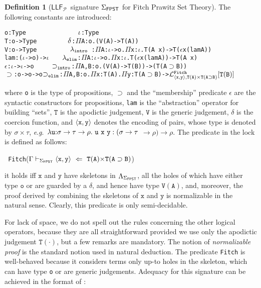 \documentclass[submission,copyright,creativecommons]{eptcs}
\theoremstyle{plain}
\theoremstyle{definition}
\newtheorem{definition}{Definition}[section]
\newcommand{\LLFP}  {\mbox{$\mathsf{LLF}_{\mathcal P}$}}
\newcommand {\eg}        {{\textit{e}.\textit{g}.}}
\newcommand {\Lock}   [4] {{\mathcal{L}}^{#1}_{#2, #3}[{#4}]} \newcommand {\LockC} [3] {{\mathcal{L}}^{#1}_{#2}      [{#3}]}
\newcommand{\fwd}[1]  {\hspace{#1mm}}
\newcommand{\down}[1] {\vspace{#1mm}}
\begin{document}
\begin{definition}[\LLFP\ signature $\Sigma_{\sf FPST}$ for Fitch
  Prawitz Set Theory]\label{signature-fitch}
The  following constants are introduced: {\begin{alltt}
o   : Type \(\fwd{26}\iota\)        : Type
T   : o -> Type \(\fwd{15.5}\delta\)        : \(\Pi\)A:o.  (V(A) -> T(A))
V   : o -> Type \(\fwd{16.5}\mathtt{\lambda_{intro}}\) \,\;: \(\Pi\)A:\(\iota\) ->o.\(\Pi\)x:\(\iota\).T(A\ x) -> T(\(\epsilon\) x (lam A))
lam : (\(\iota\) -> o)-> \(\iota\) \(\fwd{6.5}\mathtt{\lambda_{elim}}\)  : \(\Pi\)A:\(\iota\) ->o.\(\Pi\)x:\(\iota\).T(\(\epsilon\) x (lam A))->T(A\ x)
\(\epsilon\)   : \(\iota\) -> \({\iota}\) -> o \(\fwd{9}\mathtt{\supset_{intro}}\): \(\Pi\)A,B:o.(V(A) -> T(B)) -> (T(A \(\supset\)B))
\(\supset \)  \!: o -> o -> o \(\hfill\mathtt{\supset_{elim}}\) : \(\Pi\)A,B:o.\(\Pi\)x:T(A).\(\Pi\)y:T(A\(\supset\)B) -> \({\Lock{\scriptsize\tt{Fitch}}{\scriptsize{\mathtt{\langle{x},y\rangle}}}{\scriptsize\mathtt{{T(A)}\times\mathtt{T(A{\supset}B)}}}{\mathtt{T(B)}}}\)
\end{alltt}
}
\noindent where {\tt o} is the type of propositions, $\supset$ and the
``membership'' predicate $\epsilon$ are the syntactic constructors for
propositions, {\tt lam} is the ``abstraction'' operator for building
``sets'', $\mathtt{T}$ is the apodictic judgement, $\mathtt{V}$ is the
generic judgement, $\delta$ is the coercion function, and
${\langle} {\tt x,y}{\rangle}$ denotes the encoding of pairs, whose
type is denoted by $\mathtt{\sigma {{\times}} \tau}$, \eg\
$\mathtt{\lambda u{:}\sigma \rightarrow \tau \rightarrow \rho.\ u\ x\
  y : (\sigma \rightarrow \tau}$
$\mathtt{\rightarrow \rho)\rightarrow \rho}$.  The predicate in the
lock is defined as follows:

  \down{1}
  {\hfill
    {\tt
      Fitch}($\Gamma\vdash_{\Sigma_{\sf FPST}} \mathtt{{\langle}
      x,y{\rangle}\ \Leftarrow\ T(A) {{\times}} T(A\supset B)}$)
  \hfill} \down{1}

  \noindent it holds iff $\mathtt{x}$ and $\mathtt{y}$ have skeletons
  in $\Lambda_{\Sigma_{\sf FPST}}$, all the holes of which have either type
  $\mathtt{o}$ or are guarded by a $\delta$, and hence have type
  $\mathtt{V(A)}$, and, moreover, the proof derived by combining the
  skeletons of $\mathtt{x}$ and $\mathtt{y}$ is normalizable in the
  natural sense. Clearly, this predicate is only semi-decidable.
\end{definition}
For lack of space, we do not spell out the rules concerning the other
logical operators, because they are all straightforward provided we
use only the apodictic judgement $\mathtt{T(\cdot)}$, but a few
remarks are mandatory. The notion of \emph{normalizable proof} is the
standard notion used in natural deduction. The predicate {\tt Fitch}
is well-behaved because it considers terms only up-to holes in the
skeleton, which can have type {\tt o} or are generic judgements.
Adequacy for this signature can be achieved in the format of \cite{HLLMSJ12}:
\end{document}
